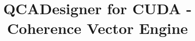 \documentclass[a4paper,12pt]{report}
\begin{document}
\title{QCADesigner for CUDA - Coherence Vector Engine}
\providecommand{\annoacc}{2010}

\titlfp

\titlepage



\headsep 2cm

\setlength{\headwidth}{\textwidth}
  \fancyhead[R]{}


	\fancyfoot[C]{\thepage}
	\renewcommand{\footrulewidth}{0.4pt}

\newpage

\tableofcontents





\newpage



\newpage



\newpage


\newpage


\newpage


\newpage


\newpage



\newpage



\end{document}
